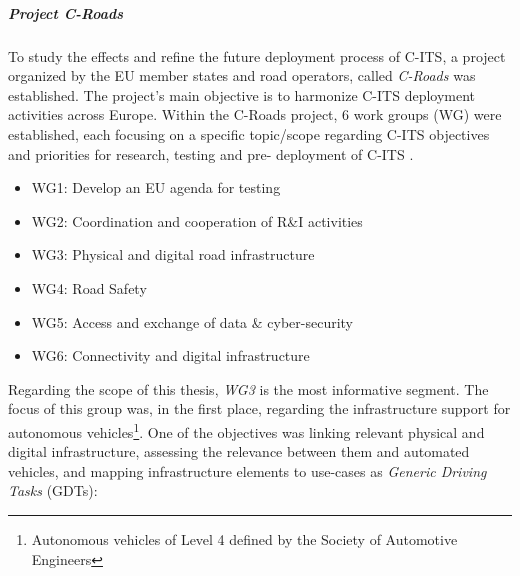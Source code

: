 \documentclass[0main.tex]{subfiles}
\begin{document}

\subparagraph{Project C-Roads}\label{sec-croads}

To study the effects and refine the future deployment process of C-ITS, a project 
organized by the EU member states and road operators, called \emph{C-Roads} was established. 
The project's main objective is to harmonize C-ITS deployment activities across Europe. 
Within the C-Roads project, 6 work groups (WG) were established, each focusing on a 
specific topic/scope regarding C-ITS objectives and priorities for research, testing and pre-
deployment of C-ITS \cite{Commision2021}. 

\begin{itemize}
    \item WG1: Develop an EU agenda for testing
    \item WG2: Coordination and cooperation of R\&I activities
    \item WG3: Physical and digital road infrastructure
    \item WG4: Road Safety
    \item WG5: Access and exchange of data \& cyber-security
    \item WG6: Connectivity and digital infrastructure
\end{itemize}

Regarding the scope of this thesis, \emph{WG3} is the most informative segment. The focus of
this group was, in the first place, regarding the infrastructure support for autonomous
vehicles\footnote{Autonomous vehicles of Level 4 defined by the Society of Automotive
Engineers}. One of the objectives was linking relevant physical and digital infrastructure,
assessing the relevance between them and automated vehicles, and mapping infrastructure
elements to use-cases as \emph{Generic Driving Tasks} (GDTs):
\end{document}
